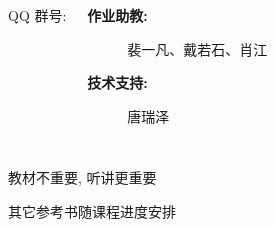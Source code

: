 \begin{frame}{}
  \begin{center}


    \pause
    \vspace{1.50cm}
  \end{center}
\end{frame}

\begin{frame}{}
  \begin{columns}
      \begin{center}
        QQ 群号: 

      \end{center}
      \begin{description}
        \item[\bf 作业助教:] 裴一凡、戴若石、肖江 \\[15pt]
        \item[\bf 技术支持:] 唐瑞泽
      \end{description}
  \end{columns}
\end{frame}

\begin{frame}{}
  \begin{center}

    \vspace{0.30cm}
    {\large 教材不重要, 听讲更重要}
  \end{center}
\end{frame}

\begin{frame}{}
  \begin{center}

    \vspace{0.30cm}
    {\large 其它参考书随课程进度安排}
  \end{center}
\end{frame}
